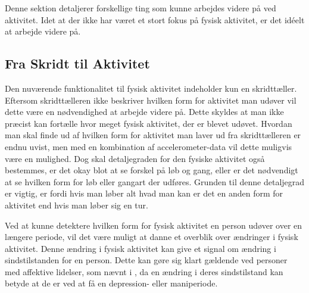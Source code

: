 Denne sektion detaljerer forskellige ting som kunne arbejdes videre på ved aktivitet.
Idet at der ikke har været et stort fokus på fysisk aktivitet, er det idéelt at arbejde videre på.

\subsection{Fra Skridt til Aktivitet}
Den nuværende funktionalitet til fysisk aktivitet indeholder kun en skridttæller.
Eftersom skridttælleren ikke beskriver hvilken form for aktivitet man udøver vil dette være en nødvendighed at arbejde videre på.
Dette skyldes at man ikke præcist kan fortælle hvor meget fysisk aktivitet, der er blevet udøvet.
Hvordan man skal finde ud af hvilken form for aktivitet man laver ud fra skridttælleren er endnu uvist, men med en kombination af accelerometer-data vil dette muligvis være en mulighed.
Dog skal detaljegraden for den fysiske aktivitet også bestemmes, er det okay blot at se forskel på løb og gang, eller er det nødvendigt at se hvilken form for løb eller gangart der udføres.
Grunden til denne detaljegrad er vigtig, er fordi hvis man løber alt hvad man kan er det en anden form for aktivitet end hvis man løber sig en tur.

Ved at kunne detektere hvilken form for fysisk aktivitet en person udøver over en længere periode, vil det være muligt at danne et overblik over ændringer i fysisk aktivitet.
Denne ændring i fysisk aktivitet kan give et signal om ændring i sindstilstanden for en person.
Dette kan gøre sig klart gældende ved personer med affektive lidelser, som nævnt i \citet[Kapitel 1, Sektion 4]{misc:faellesrapp}, da en ændring i deres sindstilstand kan betyde at de er ved at få en depression- eller maniperiode.

\begin{comment}
Den nuværende funktionalitet til fysisk aktivitet er kun en skridttæller, fra denne vil det næste logiske skridt være at lave noget der kan give et overblik over hvor meget fysisk aktivitet der har været ud fra antallet af skridt.
Helt præcist hvordan dette skal gøres og vises er uvist, men der er en mulighed for at det skulle kombineres med accelerometer data til at afgøre om der er tale om løb, gang eller anden form for bevægelse.
De forskellige gang typer skal så også fortolkes som forskellige form for aktivitet. 
Det ville også være nødvendigt at beslutte hvad for en enhed fysisk aktivitet er i, er det i Joule forbrændt eller noget andet?

Udover at beslutte hvordan fysisk aktivitet skal bestemmes skal man også beslutte sig for hvad det skal bruges til.
I sammenhæng med det primære fokus vi har på affektive lidelser, vil et oplagt fokus være at se på ændringer i mængden af fysisk aktivitet, da det giver et signal om ændringer i sindstilstand for patienter med affektive lidelser, hvilket også blev nævnt i \citet[Kapitel 1, Sektion 4]{misc:faellesrapp}.
\end{comment}
